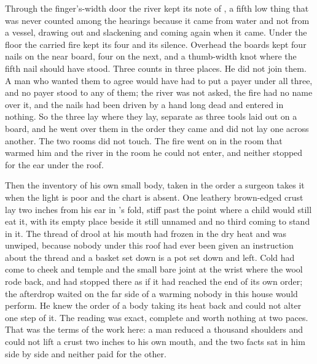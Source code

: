 Through the finger's-width door the river kept its note of , a fifth low thing that was never counted among the hearings because it came from water and not from a vessel, drawing out and slackening and coming again when it came. Under the floor the carried fire kept its four and its silence. Overhead the boards kept four nails on the near board, four on the next, and a thumb-width knot where the fifth nail should have stood. Three counts in three places. He did not join them. A man who wanted them to agree would have had to put a payer under all three, and no payer stood to any of them; the river was not asked, the fire had no name over it, and the nails had been driven by a hand long dead and entered in nothing. So the three lay where they lay, separate as three tools laid out on a board, and he went over them in the order they came and did not lay one across another. The two rooms did not touch. The fire went on in the room that warmed him and the river in the room he could not enter, and neither stopped for the ear under the roof.

Then the inventory of his own small body, taken in the order a surgeon takes it when the light is poor and the chart is absent. One leathery brown-edged crust lay two inches from his ear in 's fold, stiff past the point where a child would still eat it, with its empty place beside it still unnamed and no third coming to stand in it. The thread of drool at his mouth had frozen in the dry heat and was unwiped, because nobody under this roof had ever been given an instruction about the thread and a basket set down is a pot set down and left. Cold had come to cheek and temple and the small bare joint at the wrist where the wool rode back, and had stopped there as if it had reached the end of its own order; the afterdrop waited on the far side of a warming nobody in this house would perform. He knew the order of a body taking its heat back and could not alter one step of it. The reading was exact, complete and worth nothing at two paces. That was the terms of the work here: a man reduced a thousand shoulders and could not lift a crust two inches to his own mouth, and the two facts sat in him side by side and neither paid for the other.

